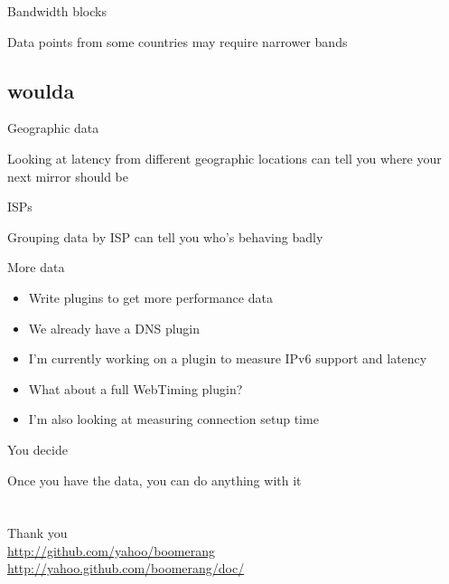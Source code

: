\documentclass{beamer}
\begin{document}
\begin{frame}{Bandwidth blocks}
  \begin{center}
  Data points from some countries may require narrower bands
  \end{center}
\end{frame}

\subsection{woulda}
\begin{frame}{Geographic data}
  \begin{center}
  Looking at latency from different geographic locations can tell you where your next mirror should be
  \end{center}
\end{frame}

\begin{frame}{ISPs}
  \begin{center}
  Grouping data by ISP can tell you who's behaving badly
  \end{center}
\end{frame}

\begin{frame}{More data}
  \begin{itemize}
  \item Write plugins to get more performance data
  \item We already have a DNS plugin
  \item I'm currently working on a plugin to measure IPv6 support and latency
  \item What about a full WebTiming plugin?
  \item I'm also looking at measuring connection setup time
  \end{itemize}
\end{frame}

\begin{frame}{You decide}
  \begin{center}
  Once you have the data, you can do anything with it
  \end{center}
\end{frame}

\section{}

\begin{frame}{}
  \begin{center}
  Thank you \\
  \tiny{
  \href{http://www.github.com/yahoo/boomerang/}{http://github.com/yahoo/boomerang} \\
  \href{http://yahoo.github.com/boomerang/doc/}{http://yahoo.github.com/boomerang/doc/}
  }
  \end{center}
\end{frame}
\end{document}
